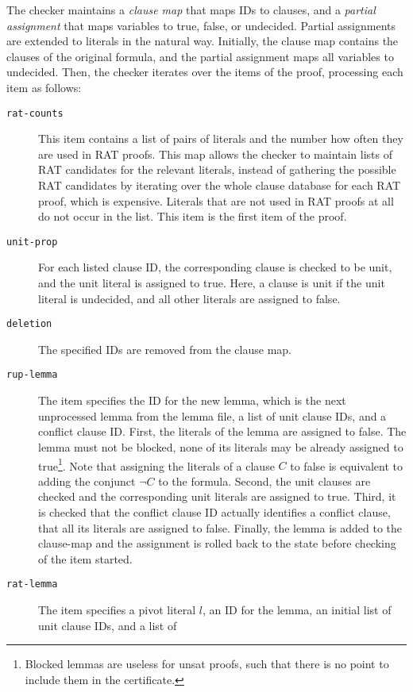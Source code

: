 \documentclass[smallcondensed]{svjour3}     %
\begin{document}
The checker maintains a \emph{clause map} that maps IDs to clauses, and a \emph{partial assignment} that maps variables to true, false, or undecided. 
Partial assignments are extended to literals in the natural way.
Initially, the clause map contains the clauses of the original formula, and the partial assignment maps all variables to undecided.
Then, the checker iterates over the items of the proof, processing each item as follows:
\begin{description}
  \item[\tt rat-counts] This item contains a list of pairs of literals and the number how often they are used in RAT proofs. 
      This map allows the checker to maintain lists of RAT candidates for the relevant literals, instead of gathering the 
      possible RAT candidates by iterating over the whole clause database for each RAT proof, which is expensive.
      Literals that are not used in RAT proofs at all do not occur in the list. This item is the first item of the proof.
  \item[\tt unit-prop] 
    For each listed clause ID, the corresponding clause is checked to be unit, and the unit literal is assigned to true.
    Here, a clause is unit if the unit literal is undecided, and all other literals are assigned to false.
  \item[\tt deletion] The specified IDs are removed from the clause map.
  \item[\tt rup-lemma] The item specifies the ID for the new lemma, which is the next unprocessed lemma from the lemma file, a list of unit clause IDs, and a conflict clause ID.
      First, the literals of the lemma are assigned to false. The lemma must not be blocked, \ie none of its literals may be already assigned to true\footnote{Blocked lemmas are useless for unsat proofs, such that there is no point to include them in the certificate.}.
        Note that assigning the literals of a clause $C$ to false is equivalent to adding the conjunct $\neg C$ to the formula. 
      Second, the unit clauses are checked and the corresponding unit literals are assigned to true.
      Third, it is checked that the conflict clause ID actually identifies a conflict clause, \ie that all its literals are assigned to false.
      Finally, the lemma is added to the clause-map and the assignment is rolled back to the state before checking of the item started.
    \item[\tt rat-lemma] The item specifies a pivot literal $l$, an ID for the lemma, an initial list of unit clause IDs, and a list of

\end{description}
\end{document}
